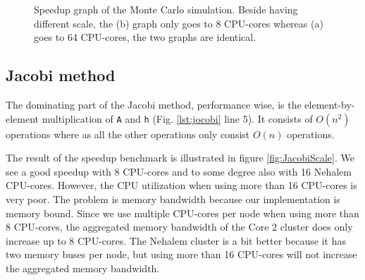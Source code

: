 \documentclass[10pt]{article}
\begin{document}
\begin{figure}%
  \begin{center}%
    \caption{Speedup graph of the Monte Carlo simulation. Beside having different scale, the (b) graph only goes to 8 CPU-cores whereas (a) goes to 64 CPU-cores, the two graphs are identical.}%
    \label{fig:MonteCarlo}%
  \end{center}
\end{figure}


\subsection{Jacobi method}
The dominating part of the Jacobi method, performance wise, is the element-by-element multiplication of \texttt{A} and \texttt{h} (Fig. \ref{lst:jocobi} line 5). It consists of $O(n^2)$ operations where as all the other operations only consist $O(n)$ operations. 


The result of the speedup benchmark is illustrated in figure \ref{fig:JacobiScale}. We see a good speedup with 8 CPU-cores and to some degree also with 16 Nehalem CPU-cores. However, the CPU utilization when using more than 16 CPU-cores is very poor. The problem is memory bandwidth because our implementation is memory bound. Since we use multiple CPU-cores per node when using more than 8 CPU-cores, the aggregated memory bandwidth of the Core 2 cluster does only increase up to 8 CPU-cores. The Nehalem cluster is a bit better because it has two memory buses per node, but using more than 16 CPU-cores will not increase the aggregated memory bandwidth.
\end{document}
